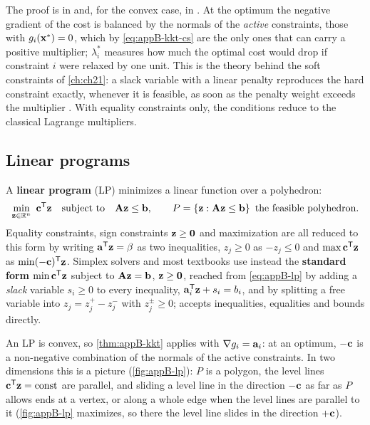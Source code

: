 The proof is in \textcite[Chapter~12]{nocedal2006numerical} and, for the
convex case, in \textcite[Chapter~5]{boyd2004convex}. At the optimum the
negative gradient of the cost is balanced by the normals of the \emph{active}
constraints, those with $g_i(\mathbf{x}^*) = 0$, which by \cref{eq:appB-kkt-cs}
are the only ones that can carry a positive multiplier; $\lambda_i^*$ measures
how much the optimal cost would drop if constraint $i$ were relaxed by one
unit. This is the theory behind the soft constraints of \cref{ch:ch21}: a slack
variable with a linear penalty reproduces the hard constraint exactly, whenever
it is feasible, as soon as the penalty weight exceeds the multiplier
\cite[Chapter~17]{nocedal2006numerical}. With equality constraints only, the
conditions reduce to the classical Lagrange multipliers.

\subsection{Linear programs}
\label{sec:appB-lp}

\begin{definition}
\label{def:appB-lp}
A \textbf{linear program} (LP) minimizes a linear function over a polyhedron:
\begin{equation}
  \min_{\vect{z} \in \R^n}\ \vect{c}\T\vect{z}\quad \st \mat{A}\vect{z} \le \vect{b},\qquad P = \set{\vect{z} : \mat{A}\vect{z} \le \vect{b}} \text{ the feasible polyhedron}.
  \label{eq:appB-lp}
\end{equation}
Equality constraints, sign constraints $\mathbf{z} \ge \mathbf{0}$ and maximization are all reduced to this form by writing $\mathbf{a}^{\mathsf{T}}\mathbf{z} = \beta$ as two inequalities, $z_j \ge 0$ as $-z_j \le 0$ and $\max \mathbf{c}^{\mathsf{T}}\mathbf{z}$ as $\min (-\mathbf{c})^{\mathsf{T}}\mathbf{z}$. Simplex solvers and most textbooks use instead the \textbf{standard form} $\min \mathbf{c}^{\mathsf{T}}\mathbf{z}$ subject to $\mathbf{A}\mathbf{z} = \mathbf{b}$, $\mathbf{z} \ge \mathbf{0}$, reached from \cref{eq:appB-lp} by adding a \emph{slack} variable $s_i \ge 0$ to every inequality, $\mathbf{a}_i^{\mathsf{T}}\mathbf{z} + s_i = b_i$, and by splitting a free variable into $z_j = z_j^+ - z_j^-$ with $z_j^\pm \ge 0$;  accepts inequalities, equalities and bounds directly.
\end{definition}

An LP is convex, so \cref{thm:appB-kkt} applies with $\nabla g_i =
\mathbf{a}_i$: at an optimum, $-\mathbf{c}$ is a non-negative combination of the
normals of the active constraints. In two dimensions this is a picture
(\cref{fig:appB-lp}): $P$ is a polygon, the level lines $\mathbf{c}^{\mathsf{T}}\mathbf{z} =
\text{const}$ are parallel, and sliding a level line in the direction
$-\mathbf{c}$ as far as $P$ allows ends at a vertex, or along a whole edge when
the level lines are parallel to it (\cref{fig:appB-lp} maximizes, so there the
level line slides in the direction $+\mathbf{c}$).

